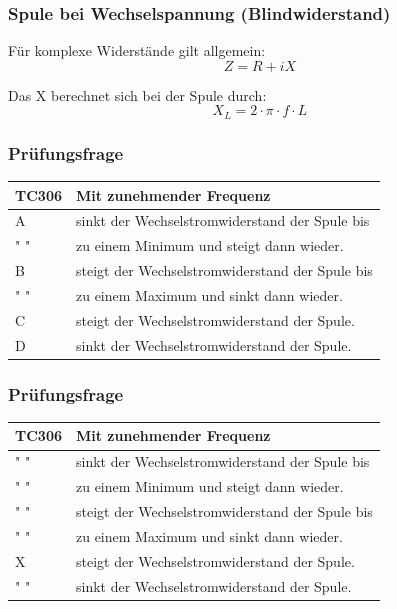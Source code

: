 \begin{frame}
    \frametitle{Spule bei Wechselspannung (Blindwiderstand)}
    Für komplexe Widerstände gilt allgemein:
    $$Z = R + iX$$
    
    Das X berechnet sich bei der Spule durch:
    $$X_L = 2\cdot \pi \cdot f\cdot L $$

\end{frame}

\begin{frame}
    \frametitle{Prüfungsfrage}    
    \begin{center}
    \begin{tabular}{l||l}\hline
        TC306 & Mit zunehmender Frequenz\\\hline\hline
        A & sinkt der Wechselstromwiderstand der Spule bis \\
        " " & zu einem Minimum und steigt dann wieder. \\ \hline
    	B & steigt der Wechselstromwiderstand der Spule bis\\
        " " & zu einem Maximum und sinkt dann wieder. \\ \hline
        C &  steigt der Wechselstromwiderstand der Spule. \\ \hline
        D & sinkt der Wechselstromwiderstand der Spule. \\ \hline
    \end{tabular}
 	    \end{center}
\end{frame}

\begin{frame}
    \frametitle{Prüfungsfrage}    
    \begin{center}
    \begin{tabular}{l||l}\hline
        TC306 & Mit zunehmender Frequenz\\\hline\hline
        " " & sinkt der Wechselstromwiderstand der Spule bis \\
        " " & zu einem Minimum und steigt dann wieder. \\ \hline
    	" " & steigt der Wechselstromwiderstand der Spule bis\\
        " " & zu einem Maximum und sinkt dann wieder. \\ \hline
        X &  steigt der Wechselstromwiderstand der Spule. \\ \hline
        " " & sinkt der Wechselstromwiderstand der Spule. \\ \hline
    \end{tabular}
 	\end{center}
\end{frame}


